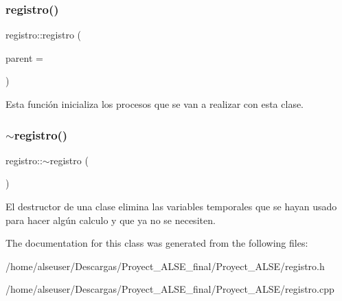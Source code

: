 \subsubsection{\texorpdfstring{registro()}{registro()}}
{\footnotesize\ttfamily registro\+::registro (\begin{DoxyParamCaption}\item[{Q\+Widget $\ast$}]{parent = {} }\end{DoxyParamCaption})\hspace{0.3cm}{\ttfamily [explicit]}}

Esta función inicializa los procesos que se van a realizar con esta clase. \mbox{\label{classregistro_addf760db779d168a84ef54c49ada3c74}} 
\subsubsection{\texorpdfstring{$\sim$registro()}{~registro()}}
{\footnotesize\ttfamily registro\+::$\sim$registro (\begin{DoxyParamCaption}{ }\end{DoxyParamCaption})}

El destructor de una clase elimina las variables temporales que se hayan usado para hacer algún calculo y que ya no se necesiten. 

The documentation for this class was generated from the following files\+:\begin{DoxyCompactItemize}
\item 
/home/alseuser/\+Descargas/\+Proyect\+\_\+\+A\+L\+S\+E\+\_\+final/\+Proyect\+\_\+\+A\+L\+S\+E/registro.\+h\item 
/home/alseuser/\+Descargas/\+Proyect\+\_\+\+A\+L\+S\+E\+\_\+final/\+Proyect\+\_\+\+A\+L\+S\+E/registro.\+cpp\end{DoxyCompactItemize}
